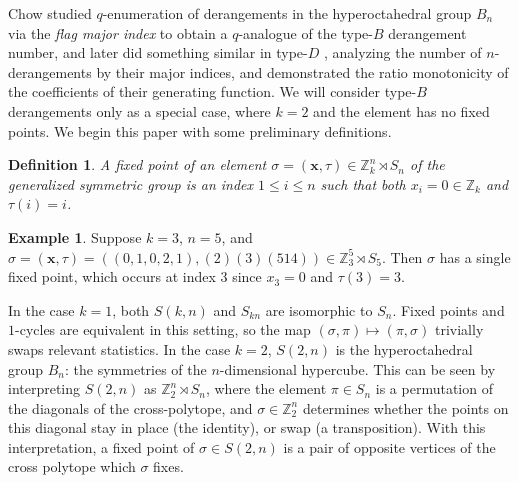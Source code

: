 \documentclass{article}
\numberwithin{theorem}{section}
\newtheorem{definition}[theorem]{Definition}
\theoremstyle{definition}
\newtheorem{example}{Example}
\newcommand{\Z}{\mathbb{Z}}
\newcommand{\x}{\mathbf x}
\newcommand{\xtau}{(\x,\tau)}
\begin{document}
Chow \cite{Chow2005} studied $q$-enumeration of derangements in the hyperoctahedral group $B_n$ via the \textit{flag major index} to obtain a $q$-analogue of
the type-$B$ derangement number, and later did something similar in type-$D$ \cite{Chow2023}, analyzing the number of $n$-derangements by their major indices, and demonstrated the ratio monotonicity of the coefficients of their generating function. We will consider type-$B$ derangements only as a special case, where $k=2$ and the element has no fixed points. We begin this paper with some preliminary definitions.

\begin{definition}
    A \emph{fixed point} of an element $\sigma = \xtau \in \mathbb{Z}_k^n \rtimes S_n$ of the generalized symmetric group is an index $1 \leq i \leq n$ such that both $x_i = 0 \in \Z_k$ and $\tau(i) = i$.
\end{definition}
\begin{example}
    Suppose $k = 3$, $n=5$, and $\sigma = \xtau = \left((0,1,0,2,1),(2)(3)(514)\right) \in \Z_3^5 \rtimes S_5$. Then $\sigma$ has a single fixed point, which occurs at index $3$ since $x_3 = 0$ and $\tau(3) = 3$.
    \label{ex:fixedPoint}
\end{example}

In the case $k=1$, both $S(k,n)$ and $S_{kn}$ are isomorphic to $S_n$. Fixed points and $1$-cycles are equivalent in this setting, so the map $(\sigma,\pi) \mapsto (\pi,\sigma)$ trivially swaps relevant statistics. In the case $k=2$, $S(2,n)$ is the hyperoctahedral group $B_n$: the symmetries of the $n$-dimensional hypercube. This can be seen by interpreting $S(2,n)$ as $\mathbb{Z}_2^n\rtimes S_n$, where the element $\pi\in S_n$ is a permutation of the diagonals of the cross-polytope, and $\sigma\in \mathbb{Z}_2^n$ determines whether the points on this diagonal stay in place (the identity), or swap (a transposition). With this interpretation, a fixed point of $\sigma \in S(2,n)$ is a pair of opposite vertices of the cross polytope which $\sigma$ fixes.
\end{document}
